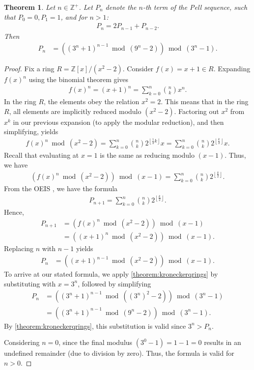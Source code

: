 \documentclass[12pt]{article}
\theoremstyle{plain}
\newtheorem{theorem}{Theorem}
\theoremstyle{definition}
\newcommand{\floor}[1]{\left\lfloor #1 \right\rfloor}
\begin{document}
\begin{theorem} \label{theorem:pell}
Let $n \in \mathbb{Z}^+$. Let $P_n$ denote the $n$-th term of the Pell sequence, such that $P_0 = 0, P_1 = 1$, and for $n > 1$:
\begin{align*}
    P_n = 2 P_{n-1} + P_{n-2} .
\end{align*}
Then
\begin{align*}
P_n &= \left((3^n+1)^{n-1} \bmod{(9^n-2)}\right) \bmod{(3^n-1)}.
\end{align*}
\end{theorem}
\begin{proof}
Fix a ring $R = \mathbb{Z}[x]/(x^2 - 2)$. Consider $f(x) = x+1 \in R$. Expanding $f(x)^n$ using the binomial theorem gives
\begin{align*}
    f(x)^n = (x+1)^n = \sum_{k=0}^{n} \binom{n}{k} x^n .
\end{align*}
In the ring $R$, the elements obey the relation $x^2 = 2$. This means that in the ring $R$, all elements are implicitly reduced modulo $(x^2 - 2)$. Factoring out $x^2$ from $x^k$ in our previous expansion (to apply the modular reduction), and then simplifying, yields
\begin{align*}
    f(x)^n \bmod{(x^2 - 2)} = \sum_{k=0}^{n} \binom{n}{k} 2^{\floor{\frac{1}{2} k}} x
    = \sum_{k=0}^{n} \binom{n}{k} 2^{\floor{\frac{k}{2}}} x .
\end{align*}
Recall that evaluating at $x=1$ is the same as reducing modulo $(x-1)$. Thus, we have
\begin{align*}
    \left(f(x)^n \bmod{(x^2-2)}\right) \bmod{(x-1)} = \sum_{k=0}^{n} \binom{n}{k} 2^{\floor{\frac{k}{2}}} .
\end{align*}
From the OEIS \cite{A000129}, we have the formula
\begin{align*}
    P_{n+1} = \sum_{k=0}^{n} \binom{n}{k} 2^{\floor{\frac{k}{2}}} .
\end{align*}
Hence,
\begin{align*}
    P_{n+1} &= \left( f(x)^n \bmod{(x^2-2)} \right) \bmod{(x-1)} \\
    &= \left( (x+1)^n \bmod{(x^2-2)} \right) \bmod{(x-1)} .
\end{align*}
Replacing $n$ with $n-1$ yields
\begin{align*}
    P_n &= \left((x+1)^{n-1} \bmod{(x^2-2)}\right) \bmod{(x-1)} .
\end{align*}
To arrive at our stated formula, we apply \cref{theorem:kroneckerqrings} by substituting with $x = 3^n$, followed by simplifying
\begin{align*}
     P_n &= \left((3^n+1)^{n-1} \bmod{((3^n)^2-2)}\right) \bmod{(3^n-1)} \\
     &= \left((3^n+1)^{n-1} \bmod{(9^n-2)}\right) \bmod{(3^n-1)} .
\end{align*}
By \cref{theorem:kroneckerqrings}, this substitution is valid since $3^n > P_n$.

Considering $n = 0$, since the final modulus $(3^0-1) = 1 - 1 = 0$ results in an undefined remainder (due to division by zero). Thus, the formula is valid for $n > 0$.
\end{proof}
\end{document}
